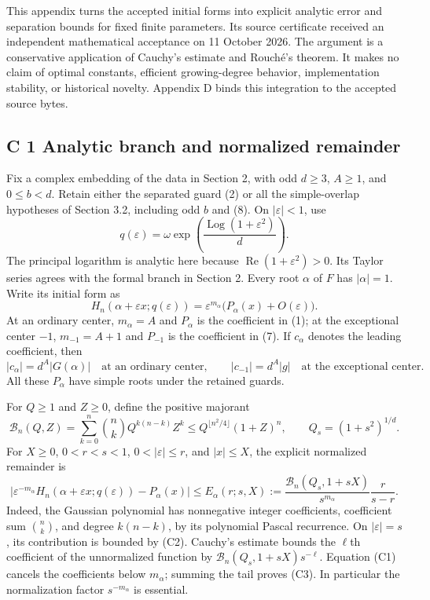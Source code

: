 \documentclass[
  11pt,
]{article}
\begin{document}
This appendix turns the accepted initial forms into explicit analytic
error and separation bounds for fixed finite parameters. Its source
certificate received an independent mathematical acceptance on
11 October 2026. The argument is a conservative application of Cauchy's
estimate and Rouch\'e's theorem. It makes no claim of optimal constants,
efficient growing-degree behavior, implementation stability, or historical
novelty. Appendix D binds this integration to the accepted source bytes.

\subsection{C 1 Analytic branch and normalized remainder}

Fix a complex embedding of the data in Section 2, with odd \(d\geq3\),
\(A\geq1\), and \(0\leq b<d\). Retain either the separated guard (2)
or all the simple-overlap hypotheses of Section 3.2, including odd \(b\)
and (8). On \(|\varepsilon|<1\), use
\[
q(\varepsilon)=\omega\exp\!\left(\frac{\operatorname{Log}(1+\varepsilon^2)}d\right).
\]
The principal logarithm is analytic here because
\(\operatorname{Re}(1+\varepsilon^2)>0\). Its Taylor series agrees with
the formal branch in Section 2. Every root \(\alpha\) of \(F\) has
\(|\alpha|=1\). Write its initial form as
\[
H_n(\alpha+\varepsilon x;q(\varepsilon))
=\varepsilon^{m_\alpha}\bigl(P_\alpha(x)+O(\varepsilon)\bigr).
\tag{C1}
\]
At an ordinary center, \(m_\alpha=A\) and \(P_\alpha\) is the
coefficient in (1); at the exceptional center \(-1\),
\(m_{-1}=A+1\) and \(P_{-1}\) is the coefficient in (7).
If \(c_\alpha\) denotes the leading coefficient, then
\[
|c_\alpha|=d^A|G(\alpha)|\quad\text{at an ordinary center},
\qquad |c_{-1}|=d^A|g|\quad\text{at the exceptional center}.
\]
All these \(P_\alpha\) have simple roots under the retained guards.

For \(Q\geq1\) and \(Z\geq0\), define the positive majorant
\[
\mathcal B_n(Q,Z)=\sum_{k=0}^n\binom nk Q^{k(n-k)}Z^k
\leq Q^{\lfloor n^2/4\rfloor}(1+Z)^n,
\qquad Q_s=(1+s^2)^{1/d}. \tag{C2}
\]
For \(X\geq0\), \(0<r<s<1\), \(0<|\varepsilon|\leq r\), and
\(|x|\leq X\), the explicit normalized remainder is
\[
\left|\varepsilon^{-m_\alpha}
 H_n(\alpha+\varepsilon x;q(\varepsilon))-P_\alpha(x)\right|
\leq E_\alpha(r;s,X)
:=\frac{\mathcal B_n(Q_s,1+sX)}{s^{m_\alpha}}\frac r{s-r}.
\tag{C3}
\]
Indeed, the Gaussian polynomial has nonnegative integer coefficients,
coefficient sum \(\binom nk\), and degree \(k(n-k)\), by its
polynomial Pascal recurrence. On \(|\varepsilon|=s\), its contribution
is bounded by (C2). Cauchy's estimate bounds the \(\ell\)th coefficient
of the unnormalized function by
\(\mathcal B_n(Q_s,1+sX)s^{-\ell}\). Equation (C1) cancels the
coefficients below \(m_\alpha\); summing the tail proves (C3).
In particular the normalization factor \(s^{-m_\alpha}\) is essential.
\end{document}
